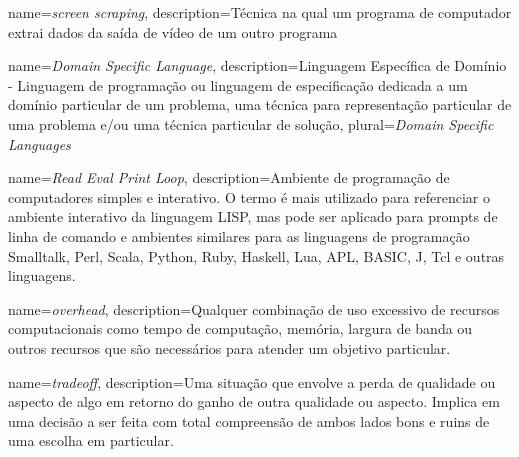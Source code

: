 				{name={\emph{screen scraping}},
				 description={Técnica na qual um programa de computador extrai dados da saída de vídeo de um outro programa}
				}
				
				{name={\emph{Domain Specific Language}},
				 description={Linguagem Específica de Domínio - Linguagem de programação ou linguagem de especificação dedicada a um domínio particular de um problema, uma técnica para representação particular de uma problema e/ou uma técnica particular de solução},
				 plural={\emph{Domain Specific Languages}}
				}
				
				{name={\emph{Read Eval Print Loop}},
				 description={Ambiente de programação de computadores simples e interativo. O termo é mais utilizado para referenciar o ambiente interativo da linguagem LISP, mas pode ser aplicado para prompts de linha de comando e ambientes similares para as linguagens de programação Smalltalk, Perl, Scala, Python, Ruby, Haskell, Lua, APL, BASIC, J, Tcl e outras linguagens.}
				}

				{name={\emph{overhead}},
				 description={Qualquer combinação de uso excessivo de recursos computacionais como tempo de computação, memória, largura de banda ou outros recursos que são necessários para atender um objetivo particular.}
				}

				{name={\emph{tradeoff}},
				 description={Uma situação que envolve a perda de qualidade ou aspecto de algo em retorno do ganho de outra qualidade ou aspecto. Implica em uma decisão a ser feita com total compreensão de ambos lados bons e ruins de uma escolha em particular.}
				}